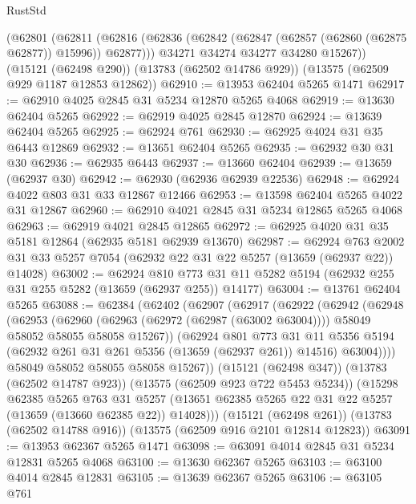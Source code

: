 \begin{lexlean}{RustStd}
\begin{coremodule}
    (@62801
      (@62811
        (@62816 (@62836 (@62842 (@62847 (@62857 (@62860 (@62875 @62877)) @15996)) @62877)))
        @34271
        @34274
        @34277
        @34280
        @15267))
    (@15121 (@62498 @290))
    (@13783 (@62502 @14786 @929))
    (@13575 (@62509 @929 @1187 @12853 @12862))
@62910 := @13953 @62404 @5265 @1471
@62917 := @62910 @4025 @2845 @31 @5234 @12870 @5265 @4068
@62919 := @13630 @62404 @5265
@62922 := @62919 @4025 @2845 @12870
@62924 := @13639 @62404 @5265
@62925 := @62924 @761
@62930 := @62925 @4024 @31 @35 @6443 @12869
@62932 := @13651 @62404 @5265
@62935 := @62932 @30 @31 @30
@62936 := @62935 @6443
@62937 := @13660 @62404
@62939 := @13659 (@62937 @30)
@62942 := @62930 (@62936 @62939 @22536)
@62948 := @62924 @4022 @803 @31 @33 @12867 @12466
@62953 := @13598 @62404 @5265 @4022 @31 @12867
@62960 := @62910 @4021 @2845 @31 @5234 @12865 @5265 @4068
@62963 := @62919 @4021 @2845 @12865
@62972 := @62925 @4020 @31 @35 @5181 @12864 (@62935 @5181 @62939 @13670)
@62987 := @62924
    @763
    @2002
    @31
    @33
    @5257
    @7054
    (@62932 @22 @31 @22 @5257 (@13659 (@62937 @22)) @14028)
@63002 := @62924
    @810
    @773
    @31
    @11
    @5282
    @5194
    (@62932 @255 @31 @255 @5282 (@13659 (@62937 @255)) @14177)
@63004 := @13761 @62404 @5265
@63088 := @62384
    (@62402
      (@62907
        (@62917
          (@62922
            (@62942
              (@62948
                (@62953
                  (@62960
                    (@62963 (@62972 (@62987 (@63002 @63004))))
                    @58049
                    @58052
                    @58055
                    @58058
                    @15267))
                (@62924
                  @801
                  @773
                  @31
                  @11
                  @5356
                  @5194
                  (@62932 @261 @31 @261 @5356 (@13659 (@62937 @261)) @14516)
                  @63004))))
          @58049
          @58052
          @58055
          @58058
          @15267))
      (@15121 (@62498 @347))
      (@13783 (@62502 @14787 @923))
      (@13575 (@62509 @923 @722 @5453 @5234))
      (@15298
        @62385
        @5265
        @763
        @31
        @5257
        (@13651 @62385 @5265 @22 @31 @22 @5257 (@13659 (@13660 @62385 @22)) @14028)))
    (@15121 (@62498 @261))
    (@13783 (@62502 @14788 @916))
    (@13575 (@62509 @916 @2101 @12814 @12823))
@63091 := @13953 @62367 @5265 @1471
@63098 := @63091 @4014 @2845 @31 @5234 @12831 @5265 @4068
@63100 := @13630 @62367 @5265
@63103 := @63100 @4014 @2845 @12831
@63105 := @13639 @62367 @5265
@63106 := @63105 @761

\end{coremodule}
\end{lexlean}
